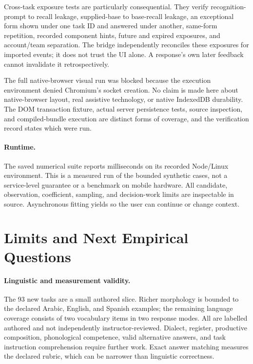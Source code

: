 Cross-task exposure tests are particularly consequential. They verify
recognition-prompt to recall leakage, supplied-base to base-recall leakage,
an exceptional form shown under one task ID and answered under another,
same-form repetition, recorded component hints, future and expired exposures, and account/team
separation. The bridge independently reconciles these exposures for imported
events; it does not trust the UI alone. A response's own later feedback
cannot invalidate it retrospectively.

The full native-browser visual run was blocked because the execution
environment denied Chromium's socket creation. No claim is made here about
native-browser layout, real assistive technology, or native IndexedDB
durability. The DOM transaction fixture, actual server persistence tests,
source inspection, and compiled-bundle execution are distinct forms of
coverage, and the verification record states which were run.

\paragraph{Runtime.}
The saved numerical suite reports \LearnerRuntime{} milliseconds on its
recorded Node/Linux environment. This is a measured run of the bounded
synthetic cases, not a service-level guarantee or a benchmark on mobile
hardware. All candidate, observation, coefficient, sampling, and decision-work
limits are inspectable in source. Asynchronous fitting yields so the user can
continue or change context.

\section{Limits and Next Empirical Questions}

\paragraph{Linguistic and measurement validity.}
The 93 new tasks are a small authored slice. Richer morphology is bounded
to the declared Arabic, English, and Spanish examples; the remaining language
coverage consists of two vocabulary items in two response modes. All are
labelled authored and not independently instructor-reviewed. Dialect,
register, productive composition, phonological competence, valid alternative
answers, and task instruction comprehension require further work. Exact
answer matching measures the declared rubric, which can be narrower than
linguistic correctness.

